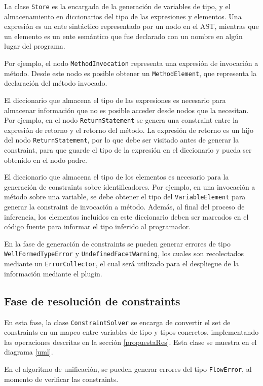 La clase \texttt{Store} es la encargada de la generación de variables de tipo, y el almacenamiento en diccionarios del tipo de las expresiones y elementos. Una expresión es un ente sintáctico representado por un nodo en el AST, mientras que un elemento es un ente semántico que fue declarado con un nombre en algún lugar del programa.

Por ejemplo, el nodo \texttt{MethodInvocation} representa una expresión de invocación a método. Desde este nodo es posible obtener un \texttt{MethodElement}, que representa la declaración del método invocado.

El diccionario que almacena el tipo de las expresiones es necesario para almacenar información que no es posible acceder desde nodos que la necesitan. Por ejemplo, en el nodo \texttt{ReturnStatement} se genera una constraint entre la expresión de retorno y el retorno del método. La expresión de retorno es un hijo del nodo \texttt{ReturnStatement}, por lo que debe ser visitado antes de generar la constraint, para que guarde el tipo de la expresión en el diccionario y pueda ser obtenido en el nodo padre.

El diccionario que almacena el tipo de los elementos es necesario para la generación de constraints sobre identificadores. Por ejemplo, en una invocación a método sobre una variable, se debe obtener el tipo del \texttt{VariableElement} para generar la constraint de invocación a método. Además, al final del proceso de inferencia, los elementos incluidos en este diccionario deben ser marcados en el código fuente para informar el tipo inferido al programador.

En la fase de generación de constraints se pueden generar errores de tipo \texttt{WellFormedTypeError} y \texttt{UndefinedFacetWarning}, los cuales son recolectados mediante un \texttt{ErrorCollector}, el cual será utilizado para el despliegue de la información mediante el plugin.

\subsection{Fase de resolución de constraints}
En esta fase, la clase \texttt{ConstraintSolver} se encarga de convertir el set de constraints en un mapeo entre variables de tipo y tipos concretos, implementando las operaciones descritas en la sección \ref{propuestaRes}. Esta clase se muestra en el diagrama \ref{uml}.

En el algoritmo de unificación, se pueden generar errores del tipo \texttt{FlowError}, al momento de verificar las constraints.


